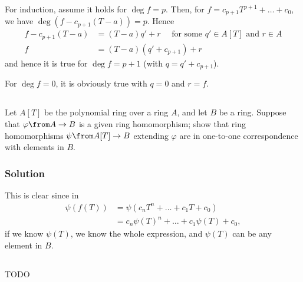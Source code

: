 For induction, assume it holds for $\operatorname{deg} f = p$. Then, for $f = c_{p + 1} T ^{p + 1} + \ldots + c_0$, we have $\operatorname{deg} \left( f - c_{p + 1} (T - a) \right) = p$. Hence
\begin{align}
	f - c_{p + 1} (T - a) &= (T - a) q' + r \quad \text{ for some } q' \in A[T] \text{ and } r \in A\\
	f &= (T - a) (q' + c_{p + 1}) + r
\end{align}
and hence it is true for $\operatorname{deg} f = p + 1$ (with $q = q' + c_{p + 1}$).

For $\operatorname{deg} f = 0$, it is obviously true with $q = 0$ and $r = f$.


\addtocounter{subsection}{1}


\subsection{}

Let $A[T]$ be the polynomial ring over a ring $A$, and let $B$ be a ring. Suppose that $\varphi \from A \to B$ is a given ring homomorphism; show that ring homomorphisms $\psi \from A[T] \to B$ extending $\varphi$ are in one-to-one correspondence with elements in $B$.

\subsubsection*{Solution}

This is clear since in
\begin{align}
	\psi\left( f(T) \right) &= \psi\left( c_n T^n + \ldots + c_1 T + c_0 \right)\\
	&=  c_n \psi(T)^n + \ldots + c_1 \psi(T) + c_0,
\end{align}
if we know $\psi(T)$, we know the whole expression, and $\psi(T)$ can be any element in $B$.

\addtocounter{subsection}{2}

\subsection{}
TODO





\section{}
\subsection{}

